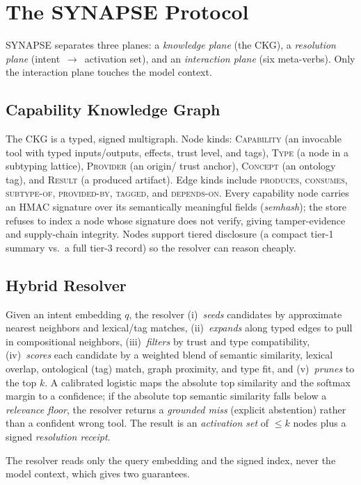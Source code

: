 \documentclass[11pt]{article}
\theoremstyle{plain}
\theoremstyle{definition}
\begin{document}
\section{The SYNAPSE Protocol}
SYNAPSE separates three planes: a \emph{knowledge plane} (the CKG), a
\emph{resolution plane} (intent~$\to$~activation set), and an \emph{interaction
plane} (six meta-verbs). Only the interaction plane touches the model context.

\subsection{Capability Knowledge Graph}
The CKG is a typed, signed multigraph. Node kinds: \textsc{Capability} (an
invocable tool with typed inputs/outputs, effects, trust level, and tags),
\textsc{Type} (a node in a subtyping lattice), \textsc{Provider} (an origin/
trust anchor), \textsc{Concept} (an ontology tag), and \textsc{Result} (a
produced artifact). Edge kinds include \textsc{produces}, \textsc{consumes},
\textsc{subtype-of}, \textsc{provided-by}, \textsc{tagged}, and
\textsc{depends-on}. Every capability node carries an HMAC signature over its
semantically meaningful fields (\emph{semhash}); the store refuses to index a
node whose signature does not verify, giving tamper-evidence and supply-chain
integrity. Nodes support tiered disclosure (a compact tier-1 summary vs.\ a full
tier-3 record) so the resolver can reason cheaply.

\subsection{Hybrid Resolver}
Given an intent embedding $q$, the resolver (i)~\emph{seeds} candidates by
approximate nearest neighbors and lexical/tag matches, (ii)~\emph{expands} along
typed edges to pull in compositional neighbors, (iii)~\emph{filters} by trust
and type compatibility, (iv)~\emph{scores} each candidate by a weighted blend of
semantic similarity, lexical overlap, ontological (tag) match, graph proximity,
and type fit, and (v)~\emph{prunes} to the top $k$. A calibrated logistic maps
the absolute top similarity and the softmax margin to a confidence; if the
absolute top semantic similarity falls below a \emph{relevance floor}, the
resolver returns a \emph{grounded miss} (explicit abstention) rather than a
confident wrong tool. The result is an \emph{activation set} of $\le k$ nodes
plus a signed \emph{resolution receipt}.

The resolver reads only the query embedding and the signed index, never the
model context, which gives two guarantees.
\end{document}
